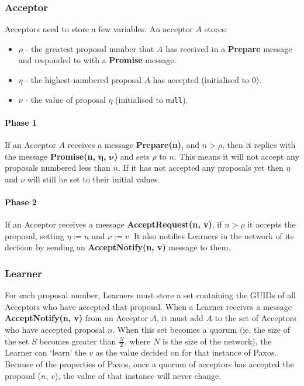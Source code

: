 \documentclass[12pt,twoside,notitlepage]{report}
\newcommand{\msg}[1] {{\bf #1}}         %
\begin{document}
\subsubsection*{Acceptor}

Acceptors need to store a few variables. An acceptor $A$ stores:
\begin{itemize}
\item $\rho$ - the greatest proposal number that $A$ has received in a \msg{Prepare} message and
	responded to with a \msg{Promise} message.
\item $\eta$ - the highest-numbered proposal $A$ has accepted (initialised to $0$).
\item $\nu$ - the value of proposal $\eta$ (initialised to \verb+null+).
\end{itemize}

\paragraph{Phase 1}

If an Acceptor $A$ receives a message \msg{Prepare(n)}, and $n > \rho$, then it replies with the
message \msg{Promise(n, $\bm{\eta}$, $\bm{\nu}$)} and sets $\rho$ to $n$. This means it will not
accept any proposals numbered less than $n$. If it has not accepted any proposals yet then $\eta$
and $\nu$ will still be set to their initial values.

\paragraph{Phase 2}

If an Acceptor receives a message \msg{AcceptRequest(n, v)}, if $n > \rho$ it accepts the
proposal, setting $\eta := n$ and $\nu := v$. It also notifies Learners in the network of its
decision by sending an \msg{AcceptNotify(n, v)} message to them.

\subsubsection*{Learner}

For each proposal number, Learners must store a set containing the GUIDs of all Acceptors who have
accepted that proposal. When a Learner receives a message \msg{AcceptNotify(n, v)} from an
Acceptor $A$, it must add $A$ to the set of Acceptors who have accepted proposal $n$. When this
set becomes a quorum (ie, the size of the set $S$ becomes greater than $\frac{N}{2}$, where $N$ is
the size of the network), the Learner can `learn' the $v$ as the value decided on for that
instance of Paxos. Because of the properties of Paxos, once a quorum of acceptors has accepted the
proposal ($n$, $v$), the value of that instance will never change.
\end{document}
